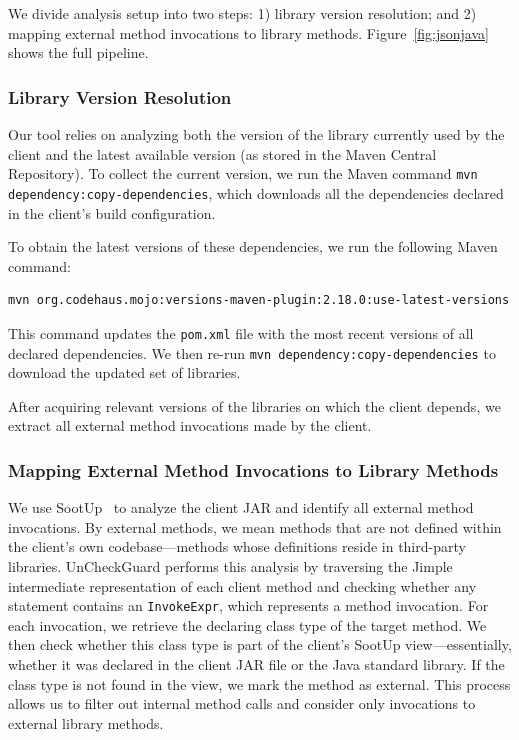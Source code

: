 We divide analysis setup into two steps: 1) library version resolution; and 2) mapping external method invocations to library methods. Figure~\ref{fig:jsonjava} shows the full pipeline.



\subsubsection{Library Version Resolution}

Our tool relies on analyzing both the version of the library currently used by the client and the latest available version (as stored in the Maven Central Repository). To collect the current version, we run the Maven command \texttt{mvn dependency:copy-dependencies}, which downloads all the dependencies declared in the client's build configuration.

To obtain the latest versions of these dependencies, we run the following Maven command:
\begin{lstlisting}[language=bash, breaklines=true, basicstyle=\ttfamily\small]
mvn org.codehaus.mojo:versions-maven-plugin:2.18.0:use-latest-versions
\end{lstlisting}
This command updates the \texttt{pom.xml} file with the most recent versions of all declared dependencies. We then re-run \texttt{mvn dependency:copy-dependencies} to download the updated set of libraries.

After acquiring relevant versions of the libraries on which the client depends, we extract all external method invocations made by the client.

\subsubsection{Mapping External Method Invocations to Library Methods}

We use SootUp~\cite{Karakaya24:_sootup} to analyze the client JAR and identify all external method invocations. By external methods, we mean methods that are not defined within the client’s own codebase—methods whose definitions reside in third-party libraries. UnCheckGuard performs this analysis by traversing the Jimple intermediate representation of each client method and checking whether any statement contains an \texttt{InvokeExpr}, which represents a method invocation. For each invocation, we retrieve the declaring class type of the target method. We then check whether this class type is part of the client’s SootUp view---essentially, whether it was declared in the client JAR file or the Java standard library. If the class type is not found in the view, we mark the method as external. This process allows us to filter out internal method calls and consider only invocations to external library methods.

